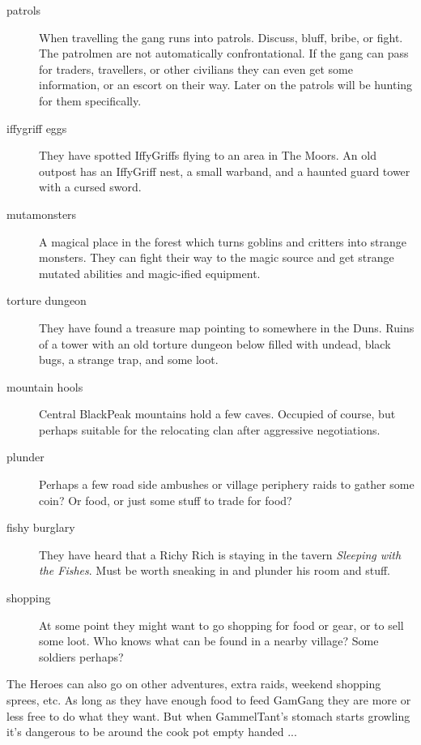 \begin{description}

    \item[patrols] When travelling the gang runs into patrols. Discuss, bluff, bribe, or fight. The patrolmen are not automatically confrontational. If the gang can pass for traders, travellers, or other civilians they can even get some information, or an escort on their way. Later on the patrols will be hunting for them specifically.

    \item[iffygriff eggs] They have spotted IffyGriffs flying to an area in The Moors. An old outpost has an IffyGriff nest, a small warband, and a haunted guard tower with a cursed sword.

    \item[mutamonsters] A magical place in the forest which turns goblins and critters into strange monsters. They can fight their way to the magic source and get strange mutated abilities and magic-ified equipment.

    \item[torture dungeon] They have found a treasure map pointing to somewhere in the Duns. Ruins of a tower with an old torture dungeon below filled with undead, black bugs, a strange trap, and some loot.
    
    \item[mountain hools] Central BlackPeak mountains hold a few caves. Occupied of course, but perhaps suitable for the relocating clan after aggressive negotiations.

    \item[plunder] Perhaps a few road side ambushes or village periphery raids to gather some coin? Or food, or just some stuff to trade for food?

    \item[fishy burglary] They have heard that a Richy Rich is staying in the tavern \emph{Sleeping with the Fishes}. Must be worth sneaking in and plunder his room and stuff.

    \item[shopping] At some point they might want to go shopping for food or gear, or to sell some loot. Who knows what can be found in a nearby village? Some soldiers perhaps?

\end{description}

\noindent The Heroes can also go on other adventures, extra raids, weekend shopping sprees, etc. As long as they have enough food to feed GamGang they are more or less free to do what they want. But when GammelTant's stomach starts growling it's dangerous to be around the cook pot empty handed ...


